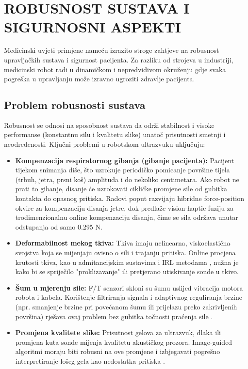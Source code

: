
\section{ROBUSNOST SUSTAVA I SIGURNOSNI ASPEKTI}
\label{sec:robusnost_sigurnost}

Medicinski uvjeti primjene nameću izrazito stroge zahtjeve na robusnost upravljačkih sustava i sigurnost pacijenta. Za razliku od strojeva u industriji, medicinski robot radi u dinamičkom i nepredvidivom okruženju gdje svaka pogreška u upravljanju može izravno ugroziti zdravlje pacijenta.

\subsection{Problem robusnosti sustava}
Robusnost se odnosi na sposobnost sustava da održi stabilnost i visoke performanse (konstantnu silu i kvalitetu slike) unatoč prisutnosti smetnji i neodređenosti. Ključni problemi u robotskom ultrazvuku uključuju:
\begin{itemize}
    \item \textbf{Kompenzacija respiratornog gibanja (gibanje pacijenta):} Pacijent tijekom snimanja diše, što uzrokuje periodičko pomicanje površine tijela (trbuh, jetra, prsni koš) amplituda i do nekoliko centimetara. Ako robot ne prati to gibanje, disanje će uzrokovati cikličke promjene sile od gubitka kontakta do opasnog pritiska. Radovi poput \cite{ieee2025robotic} razvijaju hibridne force-position okvire za kompenzaciju disanja jetre, dok \cite{ieee2025respiratory} predlaže vision-haptic fuziju za trodimenzionalnu online kompenzaciju disanja, čime se sila održava unutar odstupanja od samo 0.295 N.
    \item \textbf{Deformabilnost mekog tkiva:} Tkiva imaju nelinearna, viskoelastična svojstva koja se mijenjaju ovisno o sili i trajanju pritiska. Online procjena krutosti tkiva, kao u admitancijskim sustavima \cite{jiang2024force} i IRL metodama \cite{ieee2024inverse}, nužna je kako bi se spriječilo "proklizavanje" ili pretjerano utiskivanje sonde u tkivo.
    \item \textbf{Šum u mjerenju sile:} F/T senzori skloni su šumu uslijed vibracija motora robota i kabela. Korištenje filtriranja signala i adaptivnog reguliranja brzine (npr. smanjenje brzine pri povećanom šumu ili prijelazu preko zakrivljenih površina) rješava ovaj problem bez gubitka točnosti praćenja sile \cite{ieee2025survey, sae2026adaptive}.
    \item \textbf{Promjena kvalitete slike:} Prisutnost gelova za ultrazvuk, dlaka ili promjena kuta sonde mijenja kvalitetu akustičkog prozora. Image-guided algoritmi moraju biti robusni na ove promjene i izbjegavati pogrešno interpretiranje lošeg gela kao nedostatka pritiska \cite{akbari2021robotic, twente2024comparison}.
\end{itemize}

